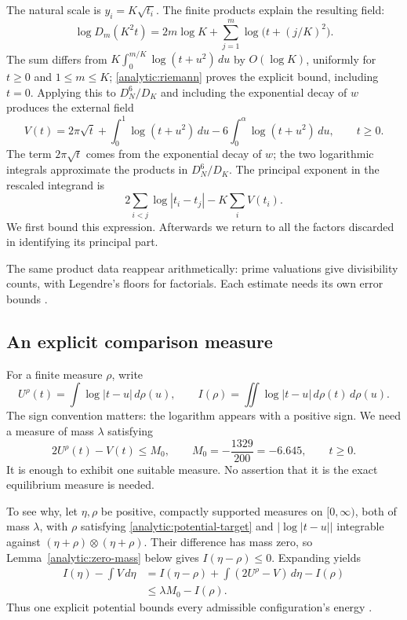 The natural scale is \(y_i=K\sqrt{t_i}\). The finite products explain
the resulting field:
\[
 \log D_m(K^2t)=2m\log K+
                   \sum_{j=1}^m\log\bigl(t+(j/K)^2\bigr).
\]
The sum differs from \(K\int_0^{m/K}\log(t+u^2)\,du\) by
\(O(\log K)\), uniformly for \(t\geq0\) and \(1\leq m\leq K\);
\eqref{analytic:riemann} proves the explicit bound, including \(t=0\).
Applying this to \(D_N^6/D_K\) and including the exponential decay
of \(w\) produces the external field
\begin{equation}\label{analytic:field}
 V(t)=2\pi\sqrt t+\int_0^1\log(t+u^2)\,du
                   -6\int_0^\alpha\log(t+u^2)\,du,\qquad t\geq0.
\end{equation}
The term \(2\pi\sqrt t\) comes from the exponential decay of \(w\); the
two logarithmic integrals approximate the products in \(D_N^6/D_K\).
The principal exponent in the rescaled integrand is
\[
 2\sum_{i<j}\log|t_i-t_j|-K\sum_i V(t_i).
\]
We first bound this expression. Afterwards we return to all the factors
discarded in identifying its principal part.

The same product data reappear arithmetically: prime valuations give
divisibility counts, with Legendre's floors for factorials.
Each estimate needs its own error bounds
\cite[Sections 5--6]{fauzan}.

\subsection{An explicit comparison measure}
\label{analytic:measure}

For a finite measure \(\rho\), write
\[
 U^\rho(t)=\int\log|t-u|\,d\rho(u),\qquad
 I(\rho)=\iint\log|t-u|\,d\rho(t)\,d\rho(u).
\]
The sign convention matters: the logarithm appears with a positive sign.
We need a measure of mass \(\lambda\) satisfying
\begin{equation}\label{analytic:potential-target}
 2U^\rho(t)-V(t)\leq M_0,\qquad
 M_0=-\frac{1329}{200}=-6.645,\qquad t\geq0.
\end{equation}
It is enough to exhibit one suitable measure. No assertion that it is
the exact equilibrium measure is needed.

To see why, let \(\eta,\rho\) be positive, compactly supported measures
on \([0,\infty)\), both of mass \(\lambda\), with \(\rho\) satisfying
\eqref{analytic:potential-target} and
\(\lvert\log|t-u|\rvert\) integrable against
\((\eta+\rho)\otimes(\eta+\rho)\).
Their difference has mass zero, so Lemma~\ref{analytic:zero-mass}
below gives \(I(\eta-\rho)\leq0\). Expanding yields
\begin{align*}
 I(\eta)-\int V\,d\eta
 &=I(\eta-\rho)+\int(2U^\rho-V)\,d\eta-I(\rho)\\
 &\leq\lambda M_0-I(\rho).
\end{align*}
Thus one explicit potential bounds every admissible configuration's
energy \cite[Section 6.1]{fauzan}.

